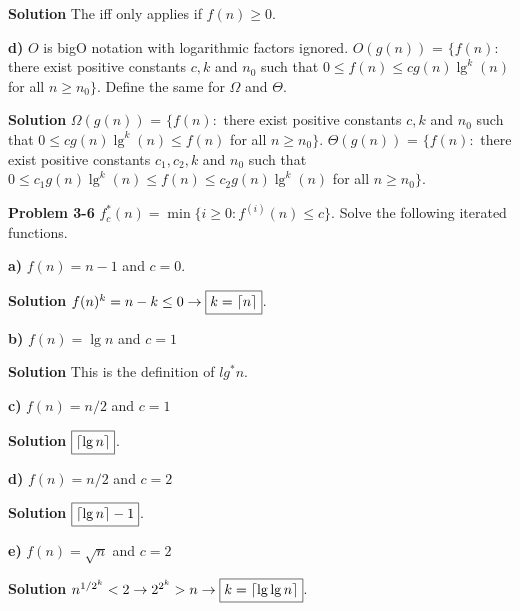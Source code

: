 \documentclass{article}
\DeclarePairedDelimiter\ceil{\lceil}{\rceil}
\begin{document}
\medskip

\textbf{Solution} The iff only applies if $f(n) \geq 0$.

\medskip

\textbf{d)} $\overset{~}{O}$ is bigO notation with logarithmic factors ignored.
$\overset{~}{O}(g(n))$ = $\{f(n):$ there exist positive constants $c, k$ and $n_0$ such that $0 \leq f(n) \leq cg(n)\lg^k(n)$ for all $n \geq n_0 \}$. Define the same for $\Omega$ and $\Theta$.

\medskip

\textbf{Solution} $\overset{~}{\Omega}(g(n))$ = $\{f(n):$ there exist positive constants $c, k$ and $n_0$ such that $0 \leq cg(n)\lg^k(n) \leq f(n)$ for all $n \geq n_0 \}$. $\overset{~}{\Theta}(g(n))$ = $\{f(n):$ there exist positive constants $c_1, c_2, k$ and $n_0$ such that $0 \leq c_1g(n)\lg^k(n) \leq f(n) \leq c_2g(n)\lg^k(n)$ for all $n \geq n_0 \}$. 

\hrulefill

\medskip

\textbf{Problem 3-6} $f_c^*(n) = \min\{i \geq 0: f^{(i)}(n) \leq c \}$. Solve the following iterated functions.

\medskip

\textbf{a)} $f(n) = n - 1$ and $c = 0$.

\medskip

\textbf{Solution} $f(n)^{k} = n - k \leq 0 \rightarrow \boxed{k = \ceil{n}}$.

\medskip

\textbf{b)} $f(n) = \lg n$ and $c = 1$

\medskip

\textbf{Solution} This is the definition of $lg^*{n}$.

\medskip

\textbf{c)} $f(n) = n/2$ and $ c = 1$

\medskip

\textbf{Solution} $\boxed{\ceil{\lg n}}$.

\medskip

\textbf{d)} $f(n) = n/2$ and $c=2$

\medskip

\textbf{Solution} $\boxed{\ceil{\lg n} - 1}$.

\medskip

\textbf{e)} $f(n) = \sqrt{n}$ and $c = 2$

\medskip

\textbf{Solution} $n^{1/2^k} < 2 \rightarrow 2^{2^k} > n \rightarrow \boxed{k = \ceil{\lg \lg n}}$.
\end{document}

